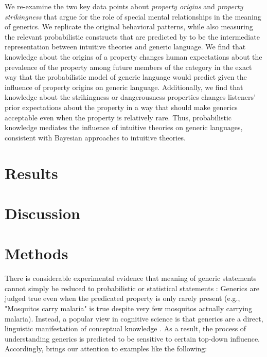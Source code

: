 \documentclass[floatsintext,doc]{apa6}
\begin{document}
We re-examine the two key data points about \emph{property origins} \cite{Gelman2007} and \emph{property strikingness} \cite{Cimpian2010} that argue for the role of special mental relationships in the meaning of generics. 
We replicate the original behavioral patterns, while also measuring the relevant probabilistic constructs that are predicted by \cite{Tessler2019} to be the intermediate representation between intuitive theories and generic language. 
We find that knowledge about the origins of a property changes human expectations about the prevalence of the property among future members of the category in the exact way that the probabilistic model of generic language would predict given the influence of property origins on generic language.
Additionally, we find that knowledge about the strikingness or dangerousness properties changes listeners' prior expectations about the property in a way that should make generics acceptable even when the property is relatively rare.
Thus, probabilistic knowledge mediates the influence of intuitive theories on generic languages, consistent with Bayesian approaches to intuitive theories. 


\section{Results}

\section{Discussion}

\section{Methods}



There is considerable experimental evidence that meaning of generic statements cannot simply be reduced to probabilistic or statistical statements : Generics are judged true even when the predicated property is only rarely present (e.g., "Mosquitos carry malaria" is true despite very few mosquitos actually carrying malaria).
Instead, a popular view in cognitive science is that generics are a direct, linguistic manifestation of conceptual knowledge \cite{Prasada, Leslie}.  
As a result, the process of understanding generics is predicted to be sensitive to certain top-down influence.
Accordingly,  brings our attention to examples like the following:
\end{document}
